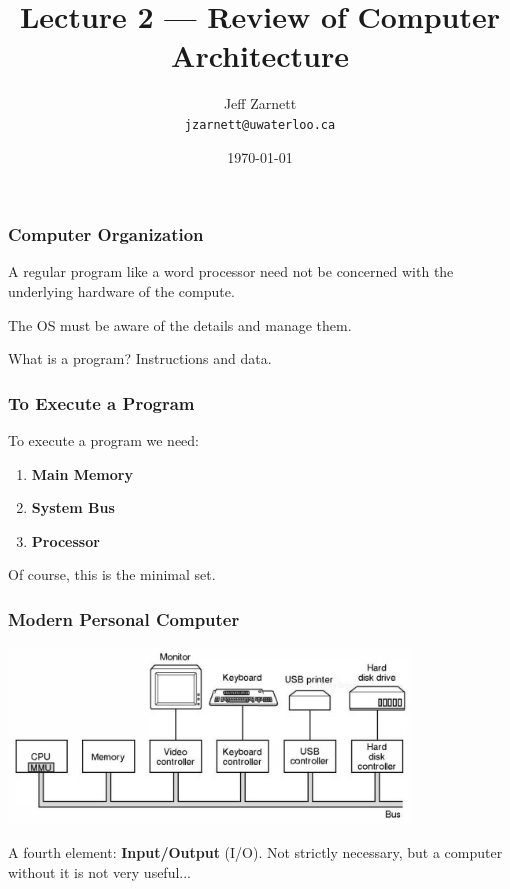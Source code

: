

\title{Lecture 2 --- Review of Computer Architecture}

\author{Jeff Zarnett \\ \small \texttt{jzarnett@uwaterloo.ca}}
\date{\today}




\begin{frame}
  \titlepage

 \end{frame}

\begin{frame}
\frametitle{Computer Organization}

A regular program like a word processor need not be concerned with the underlying hardware of the compute.

The OS must be aware of the details and manage them.

What is a program? Instructions and data.


\end{frame}

\begin{frame}
\frametitle{To Execute a Program}

To execute a program we need:

\begin{enumerate}
	\item \textbf{Main Memory}
	\item \textbf{System Bus}
	\item \textbf{Processor}
\end{enumerate}

Of course, this is the minimal set.

\end{frame}

\begin{frame}
\frametitle{Modern Personal Computer}

\begin{center}
\includegraphics[width=0.8\textwidth]{images/modernpc.png}
\end{center}

A fourth element: \textbf{Input/Output} (I/O). Not strictly necessary, but a computer without it is not very useful...
\end{frame}

